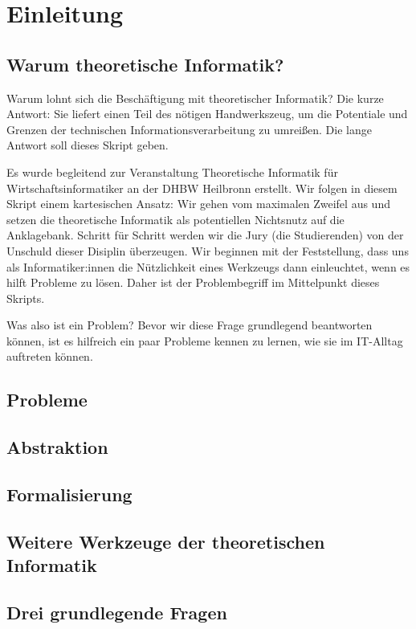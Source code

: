 \chapter{Einleitung}
\section{Warum theoretische Informatik?}
Warum lohnt sich die Beschäftigung mit theoretischer Informatik?
Die kurze Antwort: Sie liefert einen Teil des nötigen Handwerkszeug,
um die Potentiale und Grenzen der technischen Informationsverarbeitung zu umreißen.
Die lange Antwort soll dieses Skript geben.

Es wurde begleitend zur Veranstaltung Theoretische Informatik für Wirtschaftsinformatiker
an der DHBW Heilbronn erstellt.
Wir folgen in diesem Skript einem kartesischen Ansatz:
Wir gehen vom maximalen Zweifel aus und setzen die theoretische Informatik 
als potentiellen Nichtsnutz auf die Anklagebank.
Schritt für Schritt werden wir die Jury (die Studierenden) von der Unschuld dieser
Disiplin überzeugen.
Wir beginnen mit der Feststellung, dass uns als Informatiker:innen die Nützlichkeit
eines Werkzeugs dann einleuchtet, wenn es hilft Probleme zu lösen. 
Daher ist der Problembegriff im Mittelpunkt dieses Skripts.

Was also ist ein Problem?
Bevor wir diese Frage grundlegend beantworten können,
ist es hilfreich ein paar Probleme kennen zu lernen,
wie sie im IT-Alltag auftreten können.
\section{Probleme}
\section{Abstraktion}
\section{Formalisierung}
\section{Weitere Werkzeuge der theoretischen Informatik}
\section{Drei grundlegende Fragen}
